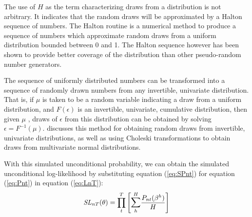 \documentclass[../main.tex]{subfiles}
\begin{document}
The use of $H$ as the term characterizing draws from a distribution is not arbitrary.
It indicates that the random draws will be approximated by a Halton sequence of numbers.
The Halton routine is a numerical method to produce a sequence of numbers which approximate random draws from a uniform distribution bounded between 0 and 1.
The Halton sequence however has been shown to provide better coverage of the distribution than other pseudo-random{\footnotemark} number generators.{\footnotemark}

\addtocounter{footnote}{-2}

The sequence of uniformly distributed numbers can be transformed into a sequence of randomly drawn numbers from any invertible, univariate distribution.
That is, if $\mu$ is taken to be a random variable indicating a draw from a uniform distribution, and $F(\epsilon)$ is an invertible, univariate, cumulative distribution, then given $\mu$ , draws of $\epsilon$ from this distribution can be obtained by solving $\epsilon = F^{-1}(\mu)$.
\textcite[236]{Train2002} discusses this method for obtaining random draws from invertible, univariate distributions, as well as using Choleski transformations to obtain draws from multivariate normal distributions.

With this simulated unconditional probability, we can obtain the simulated unconditional log-likelihood by substituting equation (\ref{eq:SPnt}) for equation (\ref{eq:Pnt}) in equation (\ref{eq:LnT}):
\begin{equation}
	\label{eq:SLnT}
	\mathit{SL}_{nT}(\theta) = \prod_t^T \left[ \mathlarger{\sum}_h^H \frac{ P_{nt}(\beta^h) }{H} \right]
\end{equation}
\end{document}
